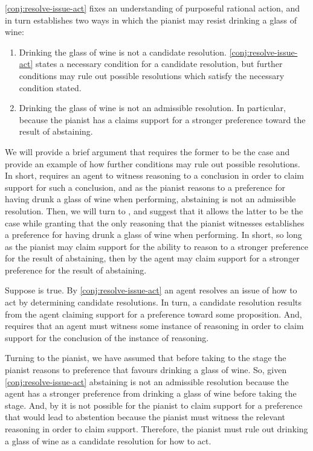 \begin{note}
  \autoref{conj:resolve-issue-act} fixes an understanding of purposeful rational action, and in turn establishes two ways in which the pianist may resist drinking a glass of wine:
  \begin{enumerate}
  \item Drinking the glass of wine is not a candidate resolution.
    \autoref{conj:resolve-issue-act} states a necessary condition for a candidate resolution, but further conditions may rule out possible resolutions which satisfy the necessary condition stated.
  \item Drinking the glass of wine is not an admissible resolution.
    In particular, because the pianist has a claims support for a stronger preference toward the result of abstaining.
  \end{enumerate}

  We will provide a brief argument that \ESU{} requires the former to be the case and provide an example of how further conditions may rule out possible resolutions.
  In short, \ESU{} requires an agent to witness reasoning to a conclusion in order to claim support for such a conclusion, and as the pianist reasons to a preference for having drunk a glass of wine when performing, abstaining is not an admissible resolution.
  Then, we will turn to \EAS{}, and suggest that it allows the latter to be the case while granting that the only reasoning that the pianist witnesses establishes a preference for having drunk a glass of wine when performing.
  In short, so long as the pianist may claim support for the ability to reason to a stronger preference for the result of abstaining, then by \EAS{} the agent may claim support for a stronger preference for the result of abstaining.
\end{note}

\begin{note}
  Suppose \ESU{} is true.
  By \autoref{conj:resolve-issue-act} an agent resolves an issue of how to act by determining candidate resolutions.
  In turn, a candidate resolution results from the agent claiming support for a preference toward some proposition.
  And, \ESU{} requires that an agent must witness some instance of reasoning in order to claim support for the conclusion of the instance of reasoning.

  Turning to the pianist, we have assumed that before taking to the stage the pianist reasons to preference that favours drinking a glass of wine.
  So, given \autoref{conj:resolve-issue-act} abstaining is not an admissible resolution because the agent has a stronger preference from drinking a glass of wine before taking the stage.
  And, by \ESU{} it is not possible for the pianist to claim support for a preference that would lead to abstention because the pianist must witness the relevant reasoning in order to claim support.
  Therefore, the pianist must rule out drinking a glass of wine as a candidate resolution for how to act.
\end{note}


